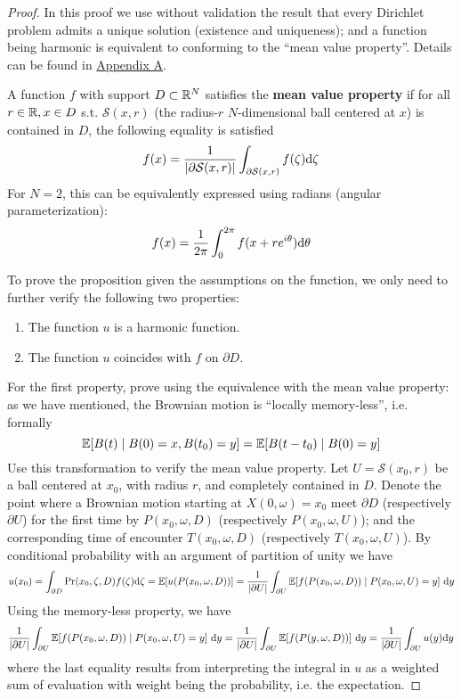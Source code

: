 \documentclass[10pt]{article}
\begin{document}
\begin{proof}
    In this proof we use without validation the result that every Dirichlet problem admits a unique solution (existence and uniqueness); and a function being harmonic is equivalent to conforming to the ``mean value property''. Details can be found in \hyperref[appendix A]{Appendix A}.

    \begin{paraindent}
        \begin{definition}\label{def: mean value property}
            A function $f$ with support $D \subset \mathbb{R}^N$ satisfies the \textbf{mean value property} if for all $r \in \mathbb{R}, x \in D$ s.t. $\mathcal{S}(x, r)$ (the radius-$r$ $N$-dimensional ball centered at $x$) is contained in $D$, the following equality is satisfied
            \[
                f(x) = \frac{1}{\left|\partial \mathcal{S}(x, r)\right|}\int_{\partial \mathcal{S}(x, r)} f(\zeta) \mathrm{d} \zeta
            \]
            For $N = 2$, this can be equivalently expressed using radians (angular parameterization):
            \[
                f(x) = \frac{1}{2 \pi} \int_0^{2\pi} f(x + r e^{i \theta}) \mathrm{d} \theta 
            \]
        \end{definition}
    \end{paraindent}

    To prove the proposition given the assumptions on the function, we only need to further verify the following two properties:
    \begin{enumerate}
        \item The function $u$ is a harmonic function.
        \item The function $u$ coincides with $f$ on $\partial D$.
    \end{enumerate}

    For the first property, prove using the equivalence with the mean value property: as we have mentioned, the Brownian motion is ``locally memory-less'', i.e. formally
    \[
        \mathbb{E}[B(t) \mid B(0) = x, B(t_0) = y] = \mathbb{E}[B(t - t_0) \mid B(0) = y]
    \]
    Use this transformation to verify the mean value property. Let $U = \mathcal{S}(x_0, r)$ be a ball centered at $x_0$, with radius $r$, and completely contained in $D$. Denote the point where a Brownian motion starting at $X(0, \omega) = x_0$ meet $\partial D$ (respectively $\partial U$) for the first time by $P(x_0, \omega, D)$ (respectively $P(x_0, \omega, U)$); and the corresponding time of encounter $T(x_0, \omega, D)$ (respectively $T(x_0, \omega, U)$). By conditional probability with an argument of partition of unity we have
    \[
        u(x_0) = \int_{\partial D} \mathrm{Pr}(x_0, \zeta, D) f(\zeta) \mathrm{d} \zeta = \mathbb{E}[u(P(x_0, \omega, D))] = \frac{1}{\left|\partial U\right|} \int_{\partial U} \mathbb{E}[f(P(x_0, \omega, D)) \mid P(x_0, \omega, U) = y]\ \mathrm{d} y
    \]
    Using the memory-less property, we have
    \[
        \frac{1}{\left|\partial U\right|} \int_{\partial U} \mathbb{E}[f(P(x_0, \omega, D)) \mid P(x_0, \omega, U) = y]\ \mathrm{d} y = \frac{1}{\left|\partial U\right|} \int_{\partial U} \mathbb{E}[ f(P(y, \omega, D)) ]\ \mathrm{d} y = \frac{1}{\left|\partial U\right|} \int_{\partial U} u(y) \mathrm{d} y
    \]
    where the last equality results from interpreting the integral in $u$ as a weighted sum of evaluation with weight being the probability, i.e. the expectation. 


\end{proof}
\end{document}
